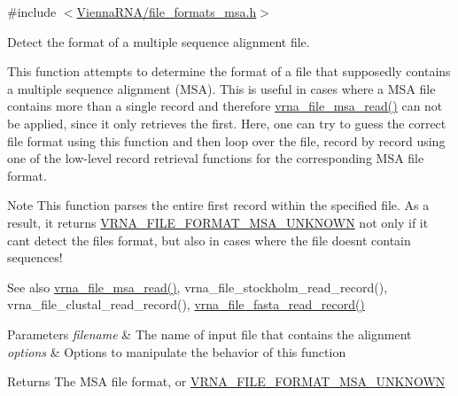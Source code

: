 {\ttfamily \#include $<$\hyperlink{file__formats__msa_8h}{Vienna\+R\+N\+A/file\+\_\+formats\+\_\+msa.\+h}$>$}



Detect the format of a multiple sequence alignment file. 

This function attempts to determine the format of a file that supposedly contains a multiple sequence alignment (M\+SA). This is useful in cases where a M\+SA file contains more than a single record and therefore \hyperlink{group__file__utils_gad02d5d12bda54611c915a1019323b7be}{vrna\+\_\+file\+\_\+msa\+\_\+read()} can not be applied, since it only retrieves the first. Here, one can try to guess the correct file format using this function and then loop over the file, record by record using one of the low-\/level record retrieval functions for the corresponding M\+SA file format.

\begin{DoxyNote}{Note}
This function parses the entire first record within the specified file. As a result, it returns \hyperlink{group__file__utils_gabdc948f547e550125de3e7c65878400c}{V\+R\+N\+A\+\_\+\+F\+I\+L\+E\+\_\+\+F\+O\+R\+M\+A\+T\+\_\+\+M\+S\+A\+\_\+\+U\+N\+K\+N\+O\+WN} not only if it can\textquotesingle{}t detect the file\textquotesingle{}s format, but also in cases where the file doesn\textquotesingle{}t contain sequences!
\end{DoxyNote}
\begin{DoxySeeAlso}{See also}
\hyperlink{group__file__utils_gad02d5d12bda54611c915a1019323b7be}{vrna\+\_\+file\+\_\+msa\+\_\+read()}, vrna\+\_\+file\+\_\+stockholm\+\_\+read\+\_\+record(), vrna\+\_\+file\+\_\+clustal\+\_\+read\+\_\+record(), \hyperlink{group__file__utils_ga8cfb7e271efc9e1f34640acb85475639}{vrna\+\_\+file\+\_\+fasta\+\_\+read\+\_\+record()}
\end{DoxySeeAlso}

\begin{DoxyParams}{Parameters}
{\em filename} & The name of input file that contains the alignment \\
\hline
{\em options} & Options to manipulate the behavior of this function \\
\hline
\end{DoxyParams}
\begin{DoxyReturn}{Returns}
The M\+SA file format, or \hyperlink{group__file__utils_gabdc948f547e550125de3e7c65878400c}{V\+R\+N\+A\+\_\+\+F\+I\+L\+E\+\_\+\+F\+O\+R\+M\+A\+T\+\_\+\+M\+S\+A\+\_\+\+U\+N\+K\+N\+O\+WN} 
\end{DoxyReturn}
